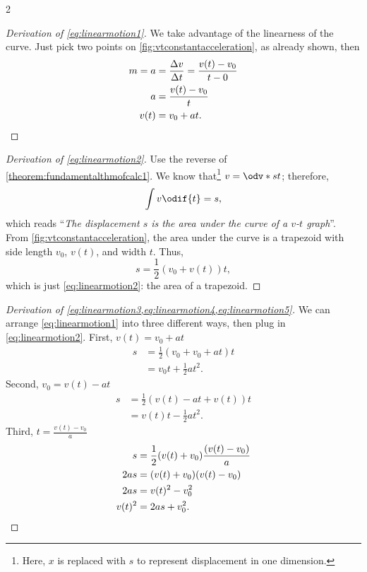 \begin{multicols}{2}
	\begin{proof}[Derivation of \cref{eq:linearmotion1}]
		We take advantage of the linearness of the curve. Just pick two points on \cref{fig:vtconstantacceleration}, as already shown, then
		\begin{align*}
			m = a & = \frac{\Delta v}{\Delta t} = \frac{v(t) - v_0}{t - 0} \\
			a     & = \frac{v(t) - v_0}{t}                                 \\
			v(t)  & = v_0 + at.\qedhere
		\end{align*}
	\end{proof}

	\begin{proof}[Derivation of \cref{eq:linearmotion2}]
		Use the reverse of \cref{theorem:fundamentalthmofcalc1}. We know that\footnote{Here, $x$ is replaced with $s$ to represent displacement in one dimension.} $v = \odv*{s}{t}$; therefore,
		\begin{equation*}
			\int v\odif{t} = s,
		\end{equation*}
		which reads ``\emph{The displacement $s$ is the area under the curve of a $v$-$t$ graph}''. From \cref{fig:vtconstantacceleration}, the area under the curve is a trapezoid with side length $v_0$, $v(t)$, and width $t$. Thus,
		\begin{equation*}
			s = \frac{1}{2}(v_0 + v(t))t,
		\end{equation*}
		which is just \cref{eq:linearmotion2}: the area of a trapezoid.
	\end{proof}

	\begin{proof}[Derivation of \cref{eq:linearmotion3,eq:linearmotion4,eq:linearmotion5}]
		We can arrange \cref{eq:linearmotion1} into three different ways, then plug in \cref{eq:linearmotion2}.
		First, $v(t) = v_0 + at$
		\begin{align*}
			s & = \frac{1}{2}(v_0 + v_0 + at)t \\
			  & = v_0t + \frac{1}{2}at^2.
		\end{align*}
		Second, $v_0 = v(t) - at$
		\begin{align*}
			s & = \frac{1}{2}(v(t) - at + v(t))t \\
			  & = v(t)t - \frac{1}{2}at^2.
		\end{align*}
		Third, $\displaystyle{t = \frac{v(t) - v_0}{a}}$
		\begin{align*}
			s      & = \frac{1}{2}(v(t) + v_0)\frac{(v(t) - v_0)}{a} \\
			2as    & = (v(t) + v_0)(v(t) - v_0)                      \\
			2as    & = v(t)^2 - v_0^2                                \\
			v(t)^2 & = 2as + v_0^2. \qedhere
		\end{align*}
	\end{proof}
\end{multicols}

